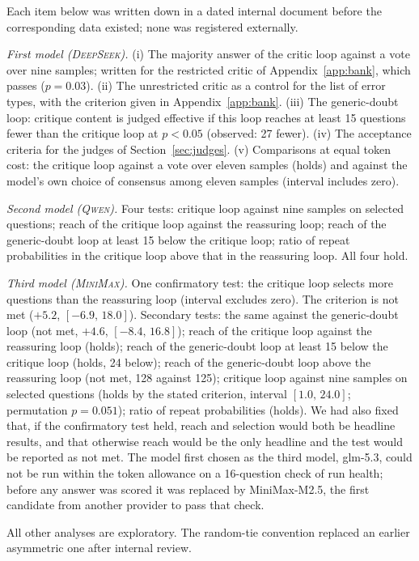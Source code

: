 \documentclass[11pt]{article}
\newcommand{\ds}{\textsc{DeepSeek}}
\newcommand{\qw}{\textsc{Qwen}}
\newcommand{\mm}{\textsc{MiniMax}}
\newcommand{\ci}[2]{$[#1,\,#2]$}
\begin{document}
Each item below was written down in a dated internal document before the corresponding data existed; none was registered externally.

\emph{First model (\ds).}
(i) The majority answer of the critic loop against a vote over nine samples; written for the restricted critic of Appendix~\ref{app:bank}, which passes ($p=0.03$).
(ii) The unrestricted critic as a control for the list of error types, with the criterion given in Appendix~\ref{app:bank}.
(iii) The generic-doubt loop: critique content is judged effective if this loop reaches at least 15 questions fewer than the critique loop at $p<0.05$ (observed: 27 fewer).
(iv) The acceptance criteria for the judges of Section~\ref{sec:judges}.
(v) Comparisons at equal token cost: the critique loop against a vote over eleven samples (holds) and against the model's own choice of consensus among eleven samples (interval includes zero).

\emph{Second model (\qw).}
Four tests: critique loop against nine samples on selected questions; reach of the critique loop against the reassuring loop; reach of the generic-doubt loop at least 15 below the critique loop; ratio of repeat probabilities in the critique loop above that in the reassuring loop.
All four hold.

\emph{Third model (\mm).}
One confirmatory test: the critique loop selects more questions than the reassuring loop (interval excludes zero).
The criterion is not met ($+5.2$, \ci{-6.9}{18.0}).
Secondary tests: the same against the generic-doubt loop (not met, $+4.6$, \ci{-8.4}{16.8}); reach of the critique loop against the reassuring loop (holds); reach of the generic-doubt loop at least 15 below the critique loop (holds, 24 below); reach of the generic-doubt loop above the reassuring loop (not met, 128 against 125); critique loop against nine samples on selected questions (holds by the stated criterion, interval \ci{1.0}{24.0}; permutation $p=0.051$); ratio of repeat probabilities (holds).
We had also fixed that, if the confirmatory test held, reach and selection would both be headline results, and that otherwise reach would be the only headline and the test would be reported as not met.
The model first chosen as the third model, glm-5.3, could not be run within the token allowance on a 16-question check of run health; before any answer was scored it was replaced by MiniMax-M2.5, the first candidate from another provider to pass that check.

All other analyses are exploratory.
The random-tie convention replaced an earlier asymmetric one after internal review.
\end{document}
